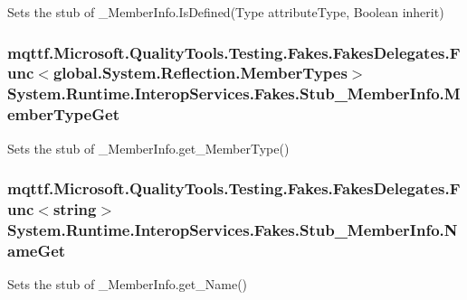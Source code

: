 Sets the stub of \-\_\-\-Member\-Info.\-Is\-Defined(\-Type attribute\-Type, Boolean inherit)

\hypertarget{class_system_1_1_runtime_1_1_interop_services_1_1_fakes_1_1_stub___member_info_ad815d1fdff20c555c0597468e3d0d39a}{
\subsubsection[{Member\-Type\-Get}]{\setlength{\rightskip}{0pt plus 5cm}mqttf.\-Microsoft.\-Quality\-Tools.\-Testing.\-Fakes.\-Fakes\-Delegates.\-Func$<$global.\-System.\-Reflection.\-Member\-Types$>$ System.\-Runtime.\-Interop\-Services.\-Fakes.\-Stub\-\_\-\-Member\-Info.\-Member\-Type\-Get}}\label{class_system_1_1_runtime_1_1_interop_services_1_1_fakes_1_1_stub___member_info_ad815d1fdff20c555c0597468e3d0d39a}


Sets the stub of \-\_\-\-Member\-Info.\-get\-\_\-\-Member\-Type()

\hypertarget{class_system_1_1_runtime_1_1_interop_services_1_1_fakes_1_1_stub___member_info_ac36acd9a47173d2f9c747331b4c8e1d8}{
\subsubsection[{Name\-Get}]{\setlength{\rightskip}{0pt plus 5cm}mqttf.\-Microsoft.\-Quality\-Tools.\-Testing.\-Fakes.\-Fakes\-Delegates.\-Func$<$string$>$ System.\-Runtime.\-Interop\-Services.\-Fakes.\-Stub\-\_\-\-Member\-Info.\-Name\-Get}}\label{class_system_1_1_runtime_1_1_interop_services_1_1_fakes_1_1_stub___member_info_ac36acd9a47173d2f9c747331b4c8e1d8}


Sets the stub of \-\_\-\-Member\-Info.\-get\-\_\-\-Name()

